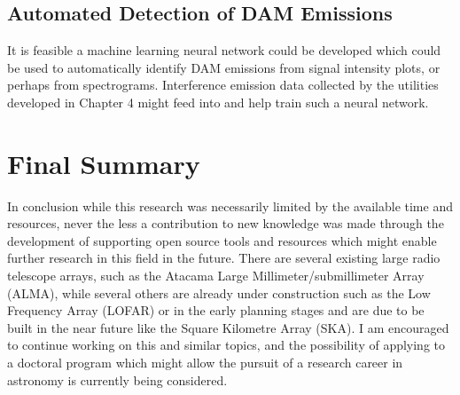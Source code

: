 \subsection*{Automated Detection of DAM Emissions}

It is feasible a machine learning neural network could be developed which could be used to automatically identify \gls{DAM} emissions from signal intensity plots, or perhaps from spectrograms. Interference emission data collected by the utilities developed in Chapter 4 might feed into and help train such a neural network.

\section*{Final Summary}

In conclusion while this research was necessarily limited by the available time and resources, never the less a contribution to new knowledge was made through the development of supporting open source tools and resources which might enable further research in this field in the future. There are several existing large radio telescope arrays, such as the Atacama Large Millimeter/submillimeter Array (ALMA), while several others are already under construction such as the Low Frequency Array (LOFAR) or in the early planning stages and are due to be built in the near future like the Square Kilometre Array (SKA). I am encouraged to continue working on this and similar topics, and the possibility of applying to a doctoral program which might allow the pursuit of a research career in astronomy is currently being considered.